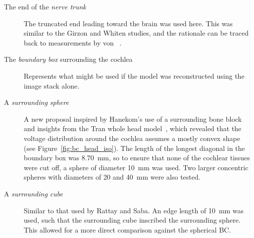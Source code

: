 \begin{description}
	\item[\textsf{The end of the \emph{nerve trunk}}] The truncated end leading
	toward the brain was used here. This was similar to the Girzon and Whiten
	studies, and the rationale can be traced back to measurements by von
	\bekesy~\cite{vonbekesy1960}.
	\item[\textsf{The \emph{boundary box} surrounding the cochlea}] Represents what
	might be used if the model was reconstructed using the image stack alone.
	\item[\textsf{A \emph{surrounding sphere}}] A new proposal inspired by
	Hanekom's use of a surrounding bone block~\cite{hanekom2001} and insights from
	the Tran whole head model~\cite{tran2013ciap}, which revealed that the voltage
	distribution around the cochlea assumes a mostly convex shape (see
	Figure~\ref{fig:bc_head_iso}). The length of the longest diagonal in the
	boundary box was 8.70~mm, so to ensure that none of the cochlear tissues were
	cut off, a sphere of diameter 10~mm was used. Two larger concentric spheres
	with diameters of 20 and 40~mm were also tested.
	\item[\textsf{A \emph{surrounding cube}}] Similar to that used by
	Rattay and Saba. An edge length of 10~mm was used, such that the surrounding
	cube inscribed the surrounding sphere. This allowed for a more direct
	comparison against the spherical BC.
\end{description}

